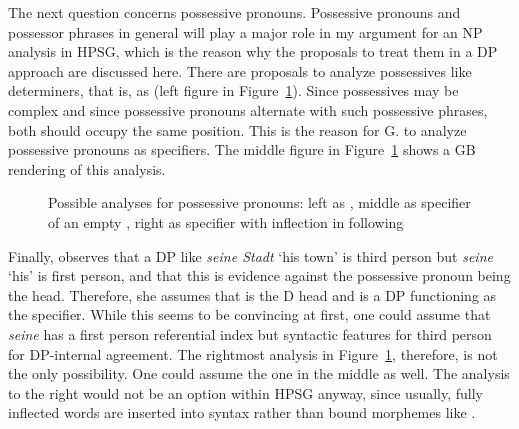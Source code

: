 \documentclass[output=paper
  ,nobabel
  ,draftmode
  ,uniformtopskip %
  ,colorlinks, citecolor=brown
]{langscibook}
\begin{document}
The next question concerns possessive pronouns. Possessive pronouns and possessor phrases in general
will play a major role in my argument for an NP analysis in HPSG, which is the reason why the
proposals to treat them in a DP approach are discussed here. There are proposals to analyze possessives like
determiners, that is, as \dnull (left figure in Figure~\ref{abb-dp-possessiva}). Since possessives may be complex and since possessive pronouns
alternate with such possessive phrases, both should occupy the same position. This is the reason for
G. \citet[]{GMueller2007a} to analyze possessive pronouns as specifiers. The middle figure
in Figure~\ref{abb-dp-possessiva} shows a GB rendering of this analysis.
\begin{figure}
\hfill
\scalebox{.8}{
\begin{forest}
sm edges
[DP
  [D$'$
    [\dnull [seine;his]]
    [NP
      [N$'$
        [\nnull [Stadt;town]]]]]]
\end{forest}}
\hfill
\scalebox{.8}{
\begin{forest}
sm edges
[DP
  [DP
    [D$'$
      [\dnull [seine;his]]]]
  [D$'$
    [\dnull [\trace]]
        [NP
          [N$'$
            [\nnull [Stadt;town]]]]]]
\end{forest}}
\hfill
\scalebox{.8}{
\begin{forest}
sm edges
[DP
  [DP
    [D$'$
      [\dnull [sein-;his]]]]
  [D$'$
    [\dnull [-e]]
        [NP
          [N$'$
            [\nnull [Stadt;town]]]]]]
\end{forest}}
\hfill\mbox{}
\caption{Possible analyses for possessive pronouns: left as \dnull, middle as specifier of an empty
  \dnull, right as specifier with inflection in \dnull following \citet[]{Olsen91b}}\label{abb-dp-possessiva}
\end{figure}
Finally, \citet[]{Olsen91b} observes that a DP like \emph{seine Stadt} `his town' is third person but
\emph{seine} `his' is first person, and that this is evidence against the possessive pronoun being the
head. Therefore, she assumes that  is the D head and  is a DP functioning
as the specifier. While this seems to be convincing at first, one could assume that \emph{seine} has
a first person referential index but syntactic features for third person for DP-internal
agreement. The rightmost analysis in Figure~\ref{abb-dp-possessiva}, therefore, is not the only possibility. One could assume the one in
the middle as well. The analysis to the right would not be an option within HPSG anyway, since
usually, fully inflected words are inserted into syntax rather than bound morphemes like .
\end{document}
